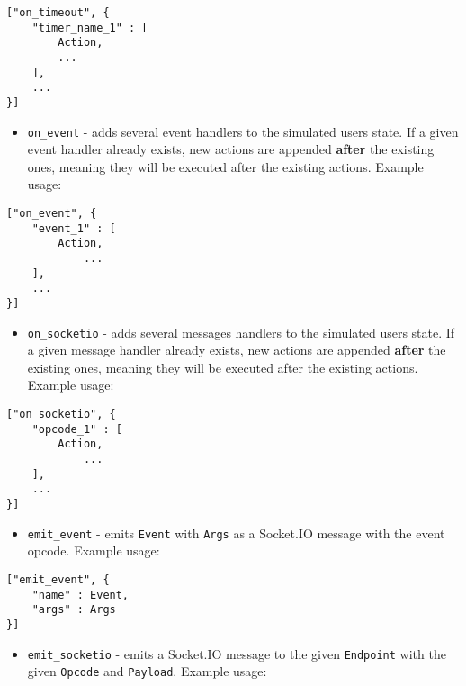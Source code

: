 \documentclass[a4paper]{article}
\begin{document}
\begin{verbatim}
["on_timeout", {
    "timer_name_1" : [
        Action,
        ...
    ],
    ...
}]
\end{verbatim}





\begin{itemize}
\item \texttt{on\_event} - adds several event handlers to the simulated users state. If a given event handler already exists, new actions are appended \textbf{after} the existing ones, meaning they will be executed after the existing actions. Example usage:
\end{itemize}

\begin{verbatim}
["on_event", {
    "event_1" : [
        Action,
            ...
    ],
    ...
}]
\end{verbatim}





\begin{itemize}
\item \texttt{on\_socketio} - adds several messages handlers to the simulated users state. If a given message handler already exists, new actions are appended \textbf{after} the existing ones, meaning they will be executed after the existing actions. Example usage:
\end{itemize}

\begin{verbatim}
["on_socketio", {
    "opcode_1" : [
        Action,
            ...
    ],
    ...
}]
\end{verbatim}





\begin{itemize}
\item \texttt{emit\_event} - emits \texttt{Event} with \texttt{Args} as a Socket.IO message with the event opcode. Example usage:
\end{itemize}

\begin{verbatim}
["emit_event", {
    "name" : Event,
    "args" : Args
}]
\end{verbatim}





\begin{itemize}
\item \texttt{emit\_socketio} - emits a Socket.IO message to the given \texttt{Endpoint} with the given \texttt{Opcode} and \texttt{Payload}. Example usage:
\end{itemize}
\end{document}
